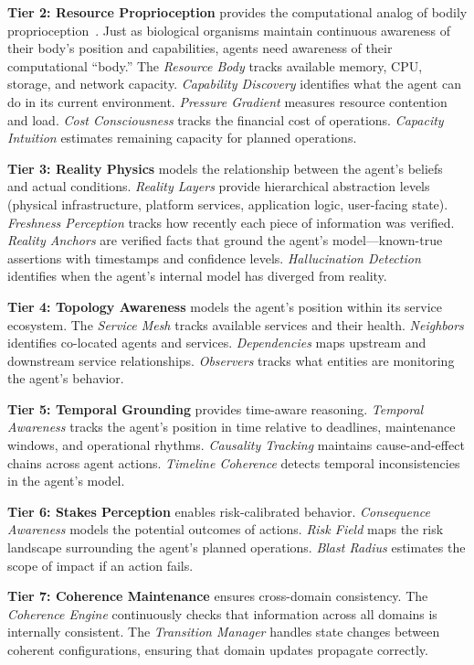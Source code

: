 \documentclass[10pt, twocolumn]{article}
\begin{document}
\textbf{Tier 2: Resource Proprioception} provides the computational analog of bodily proprioception~\cite{proske2012proprioceptive}. Just as biological organisms maintain continuous awareness of their body's position and capabilities, agents need awareness of their computational ``body.'' The \emph{Resource Body} tracks available memory, CPU, storage, and network capacity. \emph{Capability Discovery} identifies what the agent can do in its current environment. \emph{Pressure Gradient} measures resource contention and load. \emph{Cost Consciousness} tracks the financial cost of operations. \emph{Capacity Intuition} estimates remaining capacity for planned operations.

\textbf{Tier 3: Reality Physics} models the relationship between the agent's beliefs and actual conditions. \emph{Reality Layers} provide hierarchical abstraction levels (physical infrastructure, platform services, application logic, user-facing state). \emph{Freshness Perception} tracks how recently each piece of information was verified. \emph{Reality Anchors} are verified facts that ground the agent's model---known-true assertions with timestamps and confidence levels. \emph{Hallucination Detection} identifies when the agent's internal model has diverged from reality.

\textbf{Tier 4: Topology Awareness} models the agent's position within its service ecosystem. The \emph{Service Mesh} tracks available services and their health. \emph{Neighbors} identifies co-located agents and services. \emph{Dependencies} maps upstream and downstream service relationships. \emph{Observers} tracks what entities are monitoring the agent's behavior.

\textbf{Tier 5: Temporal Grounding} provides time-aware reasoning. \emph{Temporal Awareness} tracks the agent's position in time relative to deadlines, maintenance windows, and operational rhythms. \emph{Causality Tracking} maintains cause-and-effect chains across agent actions. \emph{Timeline Coherence} detects temporal inconsistencies in the agent's model.

\textbf{Tier 6: Stakes Perception} enables risk-calibrated behavior. \emph{Consequence Awareness} models the potential outcomes of actions. \emph{Risk Field} maps the risk landscape surrounding the agent's planned operations. \emph{Blast Radius} estimates the scope of impact if an action fails.

\textbf{Tier 7: Coherence Maintenance} ensures cross-domain consistency. The \emph{Coherence Engine} continuously checks that information across all domains is internally consistent. The \emph{Transition Manager} handles state changes between coherent configurations, ensuring that domain updates propagate correctly.
\end{document}

